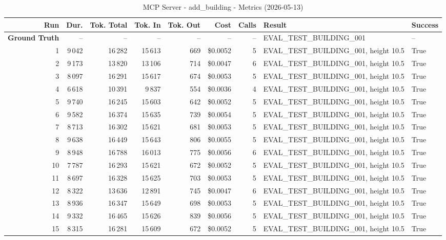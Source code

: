 \documentclass[a4paper,11pt]{article}
\begin{document}
\begin{table}[ht]
\centering
\scriptsize
\caption{MCP Server - add\_building - Metrics (2026-05-13)}
\label{tab:mcp\_add\_building\_metrics\_2026-05-13}
\begin{tabular}{r r r r r r r p{3cm} l}
\hline
Run & Dur. & Tok. Total & Tok. In & Tok. Out & Cost & Calls & Result & Success \\
\hline
\textbf{Ground Truth} & -- & -- & -- & -- & -- & -- & EVAL\_TEST\_BUILDING\_001 & -- \\
\hline
1 & 9\,042 & 16\,282 & 15\,613 & 669 & \$0.0052 & 5 & EVAL\_TEST\_BUILDING\_001, height 10.5 & True \\
2 & 9\,173 & 13\,820 & 13\,106 & 714 & \$0.0047 & 6 & EVAL\_TEST\_BUILDING\_001, height 10.5 & True \\
3 & 8\,097 & 16\,291 & 15\,617 & 674 & \$0.0053 & 5 & EVAL\_TEST\_BUILDING\_001, height 10.5 & True \\
4 & 6\,618 & 10\,391 & 9\,837 & 554 & \$0.0036 & 4 & EVAL\_TEST\_BUILDING\_001, height 10.5 & True \\
5 & 9\,740 & 16\,245 & 15\,603 & 642 & \$0.0052 & 5 & EVAL\_TEST\_BUILDING\_001, height 10.5 & True \\
6 & 9\,582 & 16\,374 & 15\,635 & 739 & \$0.0054 & 5 & EVAL\_TEST\_BUILDING\_001, height 10.5 & True \\
7 & 8\,713 & 16\,302 & 15\,621 & 681 & \$0.0053 & 5 & EVAL\_TEST\_BUILDING\_001, height 10.5 & True \\
8 & 9\,638 & 16\,449 & 15\,643 & 806 & \$0.0055 & 5 & EVAL\_TEST\_BUILDING\_001, height 10.5 & True \\
9 & 8\,948 & 16\,788 & 16\,013 & 775 & \$0.0056 & 6 & EVAL\_TEST\_BUILDING\_001, height 10.5 & True \\
10 & 7\,787 & 16\,293 & 15\,621 & 672 & \$0.0052 & 5 & EVAL\_TEST\_BUILDING\_001, height 10.5 & True \\
11 & 8\,697 & 16\,328 & 15\,625 & 703 & \$0.0053 & 5 & EVAL\_TEST\_BUILDING\_001, height 10.5 & True \\
12 & 8\,322 & 13\,636 & 12\,891 & 745 & \$0.0047 & 6 & EVAL\_TEST\_BUILDING\_001, height 10.5 & True \\
13 & 8\,936 & 16\,347 & 15\,649 & 698 & \$0.0053 & 5 & EVAL\_TEST\_BUILDING\_001, height 10.5 & True \\
14 & 9\,332 & 16\,465 & 15\,626 & 839 & \$0.0056 & 5 & EVAL\_TEST\_BUILDING\_001, height 10.5 & True \\
15 & 8\,315 & 16\,281 & 15\,609 & 672 & \$0.0052 & 5 & EVAL\_TEST\_BUILDING\_001, height 10.5 & True \\

\end{tabular}
\end{table}
\end{document}
